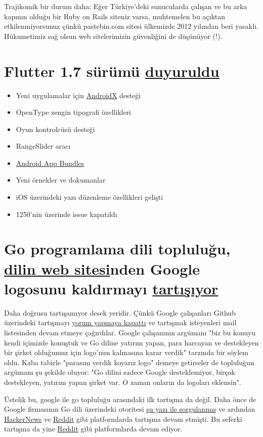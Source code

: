 \documentclass[11pt]{article}
\begin{document}
Trajikomik bir durum daha: Eğer Türkiye'deki sunucularda çalışan ve bu arka
kapının olduğu bir Ruby on Rails siteniz varsa, muhtemelen bu açıktan
etkilenmiyorsunuz çünkü pastebin.com sitesi ülkemizde 2012 yılından beri
yasaklı. Hükumetimiz sağ olsun web sitelerimizin güvenliğini de düşünüyor (!).
\section{Flutter 1.7 sürümü \href{https://medium.com/flutter/announcing-flutter-1-7-9cab4f34eacf}{duyuruldu}}
\label{sec:orgf650815}
\begin{itemize}
\item Yeni uygulamalar için \href{https://developer.android.com/jetpack/androidx}{AndroidX} desteği
\item OpenType zengin tipografi özellikleri
\item Oyun kontrolcüsü desteği
\item RangeSlider aracı
\item \href{https://developer.android.com/guide/app-bundle}{Android App Bundles}
\item Yeni örnekler ve dokumanlar
\item iOS üzerindeki yazı düzenleme özellikleri gelişti
\item 1250'nin üzerinde issue kapatıldı
\end{itemize}
\section{Go programlama dili topluluğu, \href{https://golang.org/}{dilin web sitesi}nden Google logosunu kaldırmayı \href{https://github.com/golang/go/issues/33021}{tartışıyor}}
\label{sec:org9c9bf56}
Daha doğrusu tartışamıyor desek yeridir. Çünkü Google çalışanları Github
üzerindeki tartışmayı \href{https://github.com/golang/go/issues/33021\#issuecomment-510981154}{yorum yapmaya kapattı} ve tartışmak isteyenleri mail
listesinden devam etmeye çağırdılar. Google çalışanının argümanı "biz bu
konuyu kendi içimizde konuştuk ve Go diline yatırım yapan, para harcayan ve
destekleyen bir şirket olduğumuz için logo'nun kalmasına karar verdik"
tarzında bir söylem oldu. Kaba tabirle "parasını verdik koyarız logo" demeye
getirseler de topluluğun argümanı şu şekilde oluyor: "Go dilini sadece Google
desteklemiyor, birçok destekleyen, yatırım yapan şirket var. O zaman onların
da logoları eklensin".

Üstelik bu, google ile go topluluğu arasındaki ilk tartışma da değil. Daha
önce de Google firmasının Go dili üzerindeki otoritesi \href{https://utcc.utoronto.ca/\~cks/space/blog/programming/GoIsGooglesLanguage}{şu yazı ile sorgulanmış}
ve ardından \href{https://news.ycombinator.com/item?id=19978200}{HackerNews} ve \href{https://www.reddit.com/r/programming/comments/brmxgf/go\_is\_googles\_language\_not\_the\_communitys/}{Reddit} gibi platformlarda tartışma devam etmişti. Bu
seferki tartışma da yine \href{https://www.reddit.com/r/programming/comments/ccidly/golang\_issue\_ticket\_remove\_the\_google\_logo/}{Reddit} gibi platformlarda devam ediyor.
\end{document}
